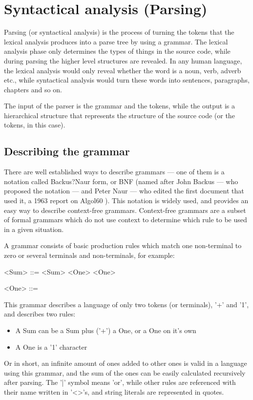 \chapter{Syntactical analysis (Parsing)}
Parsing (or syntactical analysis) is the process of turning the tokens that the lexical analysis produces into a parse tree by using a grammar. The lexical analysis phase only determines the types of things in the source code, while during parsing the higher level structures are revealed. In any human language, the lexical analysis would only reveal whether the word is a noun, verb, adverb etc., while syntactical analysis would turn these words into sentences, paragraphs, chapters and so on.

The input of the parser is the grammar and the tokens, while the output is a hierarchical structure that represents the structure of the source code (or the tokens, in this case).
\section{Describing the grammar}
There are well established ways to describe grammars --- one of them is a notation called Backus?Naur form, or BNF (named after John Backus --- who proposed the notation --- and Peter Naur --- who edited the first document that used it, a 1963 report on Algol60 \cite{backus1963revised}). This notation is widely used, and provides an easy way to describe context-free grammars. Context-free grammars are a subset of formal grammars which do not use context to determine which rule to be used in a given situation.

A grammar consists of basic production rules which match one non-terminal to zero or several terminals and non-terminals, for example:
\begin{grammar}
<Sum> ::= <Sum> \lit{+} <One>
    \alt <One> 

<One> ::= 
\end{grammar}

This grammar describes a language of only two tokens (or terminals), '+' and '1', and describes two rules:
\begin{itemize}
\item A Sum can be a Sum plus ('+') a One, or a One on it's own
\item A One is a '1' character
\end{itemize}
Or in short, an infinite amount of ones added to other ones is valid in a language using this grammar, and the sum of the ones can be easily calculated recursively after parsing. The '|' symbol means 'or', while other rules are referenced with their name written in '<>'s, and string literals are represented in quotes.

